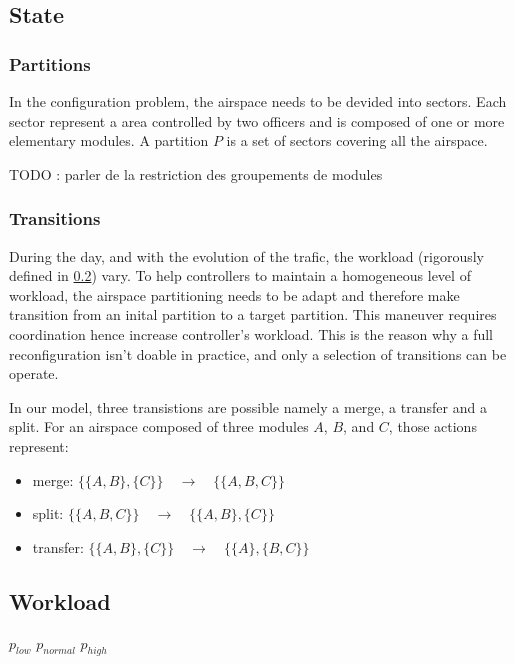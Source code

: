 \documentclass[oneside,twocolumn]{article}
\begin{document}
\subsection{State}

\subsubsection{Partitions}

In the configuration problem, the airspace needs to be devided into sectors. Each
sector represent a area controlled by two officers and is composed of
one or more elementary modules. A partition $P$ is a set of
sectors covering all the airspace.

TODO : parler de la restriction des groupements de modules 

\subsubsection{Transitions}

During the day, and with the evolution of the trafic, the workload (rigorously
defined in \ref{sub:workload}) vary. To help controllers to maintain a
homogeneous level of workload, the airspace partitioning needs to be adapt
and therefore make transition from an inital partition to a target partition.
This maneuver requires coordination hence increase controller's workload.
This is the reason why a full reconfiguration isn't doable in practice, and
only a selection of transitions can be operate.

In our model, three transistions are possible namely a merge, a transfer
and a split. For an airspace composed of three modules $A$, $B$, and $C$,
those actions represent:
\begin{itemize}
  \item merge: $\{\{A, B\}, \{C\}\} \quad \rightarrow \quad \{\{A, B, C\}\}$ 
  \item split: $\{\{A, B, C\}\} \quad \rightarrow \quad \{\{A, B\}, \{C\}\}$ 
  \item transfer: $\{\{A, B\}, \{C\}\} \quad \rightarrow \quad \{\{A\}, \{B, C\}\}$ 
\end{itemize}

\subsection{Workload}\label{sub:workload}

$p_{low}$
$p_{normal}$
$p_{high}$
\end{document}
